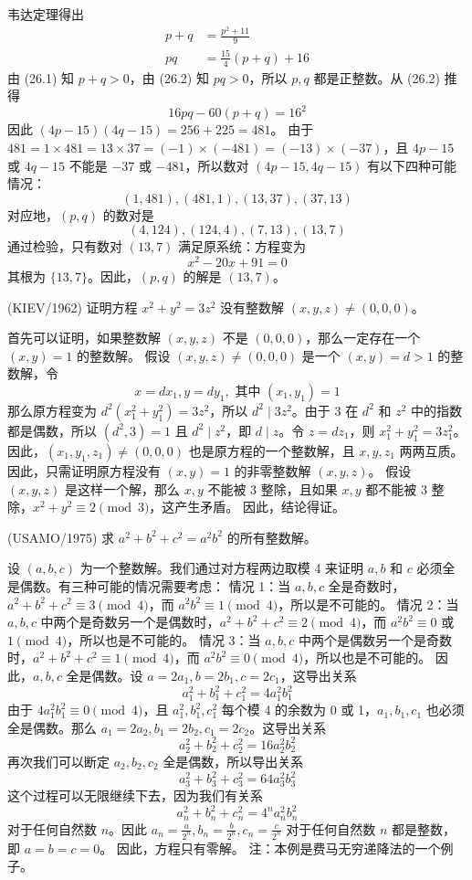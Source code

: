 \begin{questions}
\begin{solution}
韦达定理得出
\begin{align*}
p+q &= \frac{p^2+11}{9} \tag{26.1} \\
pq &= \frac{15}{4}(p+q)+16 \tag{26.2}
\end{align*}
由 (26.1) 知 $p+q>0$，由 (26.2) 知 $pq>0$，所以 $p, q$ 都是正整数。从 (26.2) 推得
\[
16pq-60(p+q)=16^2
\]
因此 $(4p-15)(4q-15)=256+225=481$。
由于 $481=1 \times 481=13 \times 37=(-1) \times (-481)=(-13) \times (-37)$，且 $4p-15$ 或 $4q-15$ 不能是 $-37$ 或 $-481$，所以数对 $(4p-15, 4q-15)$ 有以下四种可能情况：
\[
(1,481), (481,1), (13,37), (37,13)
\]
对应地，$(p,q)$ 的数对是
\[
(4,124), (124,4), (7,13), (13,7)
\]
通过检验，只有数对 $(13,7)$ 满足原系统：方程变为
\[
x^2-20x+91=0
\]
其根为 $\{13,7\}$。因此，$(p,q)$ 的解是 $(13,7)$。
\end{solution}

\question (KIEV/1962) 证明方程 $x^2+y^2=3z^2$ 没有整数解 $(x,y,z) \neq (0,0,0)$。

\begin{solution}
首先可以证明，如果整数解 $(x,y,z)$ 不是 $(0,0,0)$，那么一定存在一个 $(x,y)=1$ 的整数解。
假设 $(x,y,z) \neq (0,0,0)$ 是一个 $(x,y)=d > 1$ 的整数解，令
\[
x=dx_1, y=dy_1, \text{ 其中 } (x_1,y_1)=1
\]
那么原方程变为 $d^2(x_1^2+y_1^2)=3z^2$，所以 $d^2 \mid 3z^2$。由于 3 在 $d^2$ 和 $z^2$ 中的指数都是偶数，所以 $(d^2,3)=1$ 且 $d^2 \mid z^2$，即 $d \mid z$。令 $z=dz_1$，则 $x_1^2+y_1^2=3z_1^2$。因此，$(x_1,y_1,z_1) \neq (0,0,0)$ 也是原方程的一个整数解，且 $x, y, z_1$ 两两互质。
因此，只需证明原方程没有 $(x,y)=1$ 的非零整数解 $(x,y,z)$。
假设 $(x,y,z)$ 是这样一个解，那么 $x, y$ 不能被 3 整除，且如果 $x, y$ 都不能被 3 整除，$x^2+y^2 \equiv 2 \pmod{3}$，这产生矛盾。
因此，结论得证。
\end{solution}

\question (USAMO/1975) 求 $a^2+b^2+c^2=a^2b^2$ 的所有整数解。

\begin{solution}
设 $(a,b,c)$ 为一个整数解。我们通过对方程两边取模 4 来证明 $a, b$ 和 $c$ 必须全是偶数。有三种可能的情况需要考虑：
情况 1：当 $a, b, c$ 全是奇数时，$a^2+b^2+c^2 \equiv 3 \pmod{4}$，而 $a^2b^2 \equiv 1 \pmod{4}$，所以是不可能的。
情况 2：当 $a, b, c$ 中两个是奇数另一个是偶数时，$a^2+b^2+c^2 \equiv 2 \pmod{4}$，而 $a^2b^2 \equiv 0$ 或 $1 \pmod{4}$，所以也是不可能的。
情况 3：当 $a, b, c$ 中两个是偶数另一个是奇数时，$a^2+b^2+c^2 \equiv 1 \pmod{4}$，而 $a^2b^2 \equiv 0 \pmod{4}$，所以也是不可能的。
因此，$a, b, c$ 全是偶数。设 $a=2a_1, b=2b_1, c=2c_1$，这导出关系
\[
a_1^2+b_1^2+c_1^2=4a_1^2b_1^2
\]
由于 $4a_1^2b_1^2 \equiv 0 \pmod{4}$，且 $a_1^2, b_1^2, c_1^2$ 每个模 4 的余数为 0 或 1，$a_1, b_1, c_1$ 也必须全是偶数。那么 $a_1=2a_2, b_1=2b_2, c_1=2c_2$。这导出关系
\[
a_2^2+b_2^2+c_2^2=16a_2^2b_2^2
\]
再次我们可以断定 $a_2, b_2, c_2$ 全是偶数，所以导出关系
\[
a_3^2+b_3^2+c_3^2=64a_3^2b_3^2
\]
这个过程可以无限继续下去，因为我们有关系
\[
a_n^2+b_n^2+c_n^2=4^n a_n^2b_n^2
\]
对于任何自然数 $n$。因此 $a_n = \frac{a}{2^n}, b_n = \frac{b}{2^n}, c_n = \frac{c}{2^n}$ 对于任何自然数 $n$ 都是整数，即 $a=b=c=0$。
因此，方程只有零解。
注：本例是费马无穷递降法的一个例子。
\end{solution}


\end{questions}
